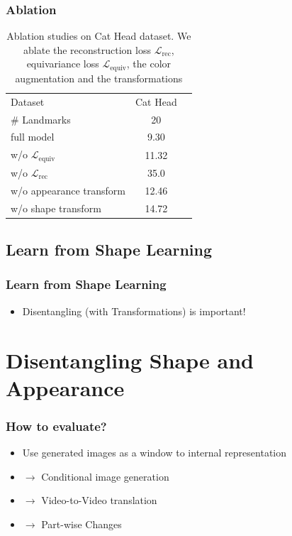 		\begin{frame}[t]
		\frametitle{Ablation}
			\begin{table}
				\centering
				\begin{tabular}{l|cr}
					\hline
					Dataset & Cat Head    \\
					\# Landmarks &  20 \\ \hline
					full model &  9.30 \\ \hline
					w/o $\mathcal{L}_{\textrm{equiv}}$   & 11.32 \\
					w/o $\mathcal{L}_{\textrm{rec}}$   & 35.0 \\
					w/o appearance transform & 12.46 \\
					w/o shape transform & 14.72 \\ \hline
				\end{tabular}
				\caption{{Ablation studies on Cat Head dataset. We ablate the reconstruction loss $\mathcal{L}_{\textrm{rec}}$, equivariance loss $\mathcal{L}_{\textrm{equiv}}$, the color augmentation and the transformations}}
				\label{tab:ablation}
			\end{table}
		\end{frame}

	\subsection{Learn from Shape Learning}
		\begin{frame}[t]
		\frametitle{Learn from Shape Learning}
			\begin{itemize}
				\item Disentangling (with Transformations) is important!
			\end{itemize}
		\end{frame}

\section{Disentangling Shape and Appearance}
	\begin{frame}[t]
	\frametitle{How to evaluate?}
		\begin{itemize}
			\item Use generated images as a window to internal representation
			\item $\rightarrow$ Conditional image generation
			\item $\rightarrow$ Video-to-Video translation
			\item $\rightarrow$ Part-wise Changes
		\end{itemize}
	\end{frame}

